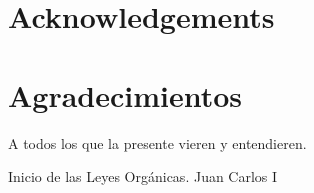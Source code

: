 %
%
%
% 
%
%
%
%

\thispagestyle{empty}

{
  \chapter*{Acknowledgements}
  \label{cha:acknowledgements}
}
{
  \chapter*{Agradecimientos}
  \label{cha:agradecimientos}
}




\begin{FraseCelebre}
  \begin{Frase}
    A todos los que la presente vieren y entendieren.
  \end{Frase}
  \begin{Fuente}
    Inicio de las Leyes Orgánicas. Juan Carlos I
  \end{Fuente}
\end{FraseCelebre}



